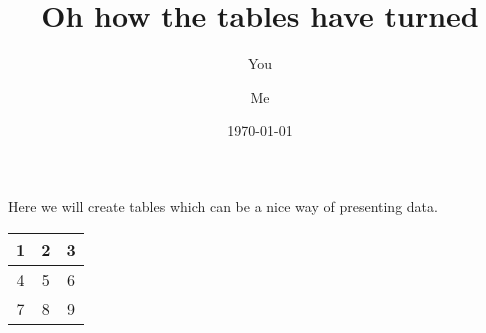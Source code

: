 \documentclass[a4paper]{article}
\begin{document}
\title{Oh how the tables have turned}
\author{You \and Me}
\date{\today}
\maketitle

Here we will create tables which can be a nice way of presenting data. 

\begin{center}
\begin{tabular} {| c | c | c | }
\hline
1 & 2 & 3 \\ \hline
4 & 5 & 6 \\ \hline
7 & 8 & 9 \\ \hline

\end{tabular}
\end{center}
\end{document}
